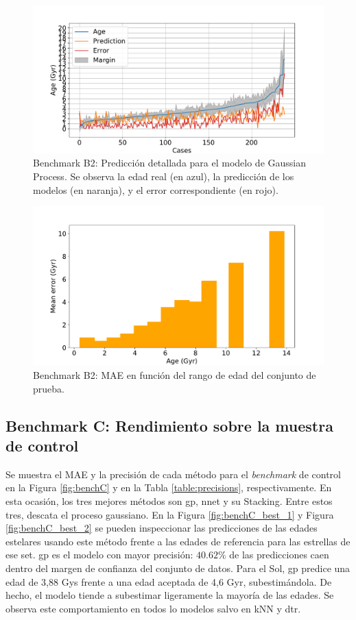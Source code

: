 \begin{figure}[H]
\begin{center}
 \includegraphics[width=0.8\linewidth]{Figuras/Experimentos/B_B2_gp_2.pdf}
\end{center}
\caption{Benchmark B2: Predicción detallada para el modelo de Gaussian Process. Se observa la edad real (en azul), la predicción de los modelos (en naranja), y el error correspondiente (en rojo).}
 \label{fig:benchB2_details_gp_2}
\end{figure}

\begin{figure}[H]
\begin{center}
 \includegraphics[width=0.8\linewidth]{Figuras/Experimentos/B_B2_gp_3.pdf}
\end{center}
\caption{Benchmark B2: MAE en función del rango de edad del conjunto de prueba.}
 \label{fig:benchB2_details_gp_3}
\end{figure}


\subsection{Benchmark C: Rendimiento sobre la muestra de control}

Se muestra el MAE y la precisión de cada método para el \emph{benchmark} de control en la Figura \ref{fig:benchC} y en la Tabla \ref{table:precisions}, respectivamente. En esta ocasión, los tres mejores métodos son gp, nnet y su Stacking. Entre estos tres, descata el proceso gaussiano. En la Figura \ref{fig:benchC_best_1} y Figura \ref{fig:benchC_best_2} se pueden inspeccionar las predicciones de las edades estelares usando este método frente a las edades de referencia para las estrellas de ese set. gp es el modelo con mayor precisión: $40.62\%$ de las predicciones caen dentro del margen de confianza del conjunto de datos. Para el Sol, gp predice una edad de 3,88 Gys frente a una edad aceptada de 4,6 Gyr, subestimándola. De hecho, el modelo tiende a subestimar ligeramente la mayoría de las edades. Se observa este comportamiento en todos lo modelos salvo en kNN y dtr. 

